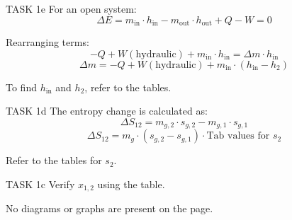 TASK 1e  
For an open system:  
\[
\Delta E = m_{\text{in}} \cdot h_{\text{in}} - m_{\text{out}} \cdot h_{\text{out}} + Q - W = 0
\]  

Rearranging terms:  
\[
-Q + W (\text{hydraulic}) + m_{\text{in}} \cdot h_{\text{in}} = \Delta m \cdot h_{\text{in}}  
\]  
\[
\Delta m = -Q + W (\text{hydraulic}) + m_{\text{in}} \cdot (h_{\text{in}} - h_2)  
\]  

To find \( h_{\text{in}} \) and \( h_2 \), refer to the tables.  

TASK 1d  
The entropy change is calculated as:  
\[
\Delta S_{12} = m_{g,2} \cdot s_{g,2} - m_{g,1} \cdot s_{g,1}  
\]  
\[
\Delta S_{12} = m_{g} \cdot (s_{g,2} - s_{g,1}) \cdot \text{Tab values for } s_2  
\]  

Refer to the tables for \( s_2 \).  

TASK 1c  
Verify \( x_{1,2} \) using the table.  

No diagrams or graphs are present on the page.